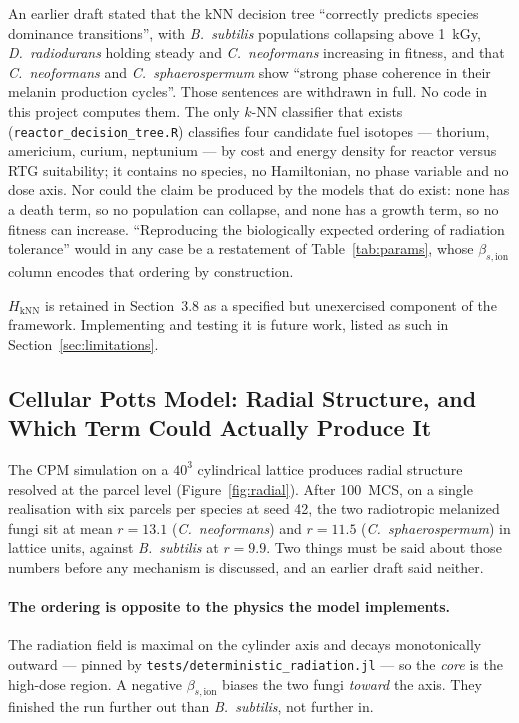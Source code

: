 \documentclass[11pt]{article}
\begin{document}
An earlier draft stated that the kNN decision tree ``correctly predicts species dominance
transitions'', with \textit{B.\ subtilis} populations collapsing above 1~kGy, \textit{D.\
radiodurans} holding steady and \textit{C.\ neoformans} increasing in fitness, and that
\textit{C.\ neoformans} and \textit{C.\ sphaerospermum} show ``strong phase coherence in their
melanin production cycles''. Those sentences are withdrawn in full. No code in this project
computes them. The only $k$-NN classifier that exists (\texttt{reactor\_decision\_tree.R})
classifies four candidate fuel isotopes --- thorium, americium, curium, neptunium --- by cost and
energy density for reactor versus RTG suitability; it contains no species, no Hamiltonian, no phase
variable and no dose axis. Nor could the claim be produced by the models that do exist: none has a
death term, so no population can collapse, and none has a growth term, so no fitness can increase.
``Reproducing the biologically expected ordering of radiation tolerance'' would in any case be a
restatement of Table~\ref{tab:params}, whose $\beta_{s,\mathrm{ion}}$ column encodes that ordering
by construction.

$H_{\mathrm{kNN}}$ is retained in Section~3.8 as a specified but unexercised component of the
framework. Implementing and testing it is future work, listed as such in
Section~\ref{sec:limitations}.

\subsection{Cellular Potts Model: Radial Structure, and Which Term Could Actually Produce It}
\label{sec:cpm_results}

The CPM simulation on a $40^3$ cylindrical lattice produces radial structure resolved at the
parcel level (Figure~\ref{fig:radial}). After 100~MCS, on a single realisation with six parcels per
species at seed 42, the two radiotropic melanized fungi sit at mean $r = 13.1$
(\textit{C.~neoformans}) and $r = 11.5$ (\textit{C.~sphaerospermum}) in lattice units, against
\textit{B.~subtilis} at $r = 9.9$. Two things must be said about those numbers before any mechanism
is discussed, and an earlier draft said neither.

\paragraph{The ordering is opposite to the physics the model implements.}
The radiation field is maximal on the cylinder axis and decays monotonically outward --- pinned by
\texttt{tests/deterministic\_radiation.jl} --- so the \emph{core} is the high-dose region. A
negative $\beta_{s,\mathrm{ion}}$ biases the two fungi \emph{toward} the axis. They finished the
run further out than \textit{B.~subtilis}, not further in.
\end{document}
